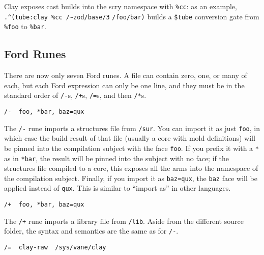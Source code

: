 \documentclass[twoside]{article}
\begin{document}
\sloppy
Clay exposes cast builds into the scry namespace with \lstinline[style=inlinecode]{%cc}: as an example, \lstinline[style=inlinecode]{.^(tube:clay %cc /~zod/base/3} \lstinline[style=inlinecode]{/foo/bar)} builds a \lstinline[style=inlinecode]{$tube} conversion gate from \lstinline[style=inlinecode]{%foo} to \lstinline[style=inlinecode]{%bar}.

\subsection{Ford Runes}

There are now only seven Ford runes. A file can contain zero, one, or many of each, but each Ford expression can only be one line, and they must be in the standard order of \lstinline[style=inlinecode]{/-}s, \lstinline[style=inlinecode]{/+}s, \lstinline[style=inlinecode]{/=}s, and then \lstinline[style=inlinecode]{/*}s.

\begin{lstlisting}[style=listingcode]
/-  foo, *bar, baz=qux
\end{lstlisting}

The \lstinline[style=inlinecode]{/-} rune imports a structures file from \lstinline[style=inlinecode]{/sur}. You can import it as just \lstinline[style=inlinecode]{foo}, in which case the build result of that file (usually a core with mold definitions) will be pinned into the compilation subject with the face \lstinline[style=inlinecode]{foo}. If you prefix it with a \lstinline[style=inlinecode]{*} as in \lstinline[style=inlinecode]{*bar}, the result will be pinned into the subject with no face; if the structures file compiled to a core, this exposes all the arms into the namespace of the compilation subject. Finally, if you import it as \lstinline[style=inlinecode]{baz=qux}, the \lstinline[style=inlinecode]{baz} face will be applied instead of \lstinline[style=inlinecode]{qux}. This is similar to ``import as'' in other languages.

\begin{lstlisting}[style=listingcode]
/+  foo, *bar, baz=qux
\end{lstlisting}

The \lstinline[style=inlinecode]{/+} rune imports a library file from \lstinline[style=inlinecode]{/lib}. Aside from the different source folder, the syntax and semantics are the same as for \lstinline[style=inlinecode]{/-}.

\begin{lstlisting}[style=listingcode]
/=  clay-raw  /sys/vane/clay
\end{lstlisting}
\end{document}
